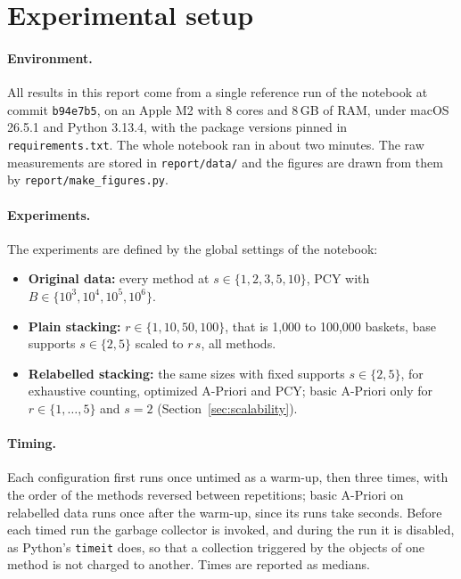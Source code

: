 \section{Experimental setup}
\label{sec:experiments}

\paragraph{Environment.} All results in this report come from a single reference run of the notebook at commit \texttt{b94e7b5}, on an Apple M2 with 8 cores and 8\,GB of RAM, under macOS 26.5.1 and Python 3.13.4, with the package versions pinned in \texttt{requirements.txt}. The whole notebook ran in about two minutes. The raw measurements are stored in \texttt{report/data/} and the figures are drawn from them by \texttt{report/make\_figures.py}.

\paragraph{Experiments.} The experiments are defined by the global settings of the notebook:
\begin{itemize}
  \item \textbf{Original data:} every method at $s \in \{1, 2, 3, 5, 10\}$, PCY with $B \in \{10^3, 10^4, 10^5, 10^6\}$.
  \item \textbf{Plain stacking:} $r \in \{1, 10, 50, 100\}$, that is 1{,}000 to 100{,}000 baskets, base supports $s \in \{2, 5\}$ scaled to $r\,s$, all methods.
  \item \textbf{Relabelled stacking:} the same sizes with fixed supports $s \in \{2, 5\}$, for exhaustive counting, optimized A-Priori and PCY; basic A-Priori only for $r \in \{1, \dots, 5\}$ and $s = 2$ (Section~\ref{sec:scalability}).
\end{itemize}

\paragraph{Timing.} Each configuration first runs once untimed as a warm-up, then three times, with the order of the methods reversed between repetitions; basic A-Priori on relabelled data runs once after the warm-up, since its runs take seconds. Before each timed run the garbage collector is invoked, and during the run it is disabled, as Python's \texttt{timeit} does, so that a collection triggered by the objects of one method is not charged to another. Times are reported as medians.

